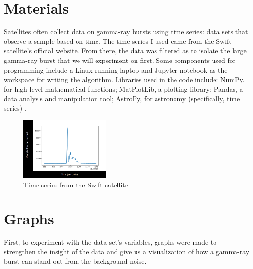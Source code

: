 \documentclass[final,5p,times,twocolumn,authoryear]{elsarticle}
\begin{document}
\section{Materials}
Satellites often collect data on gamma-ray bursts using time series: data sets that observe a sample based on time. The time series I used came from the Swift satellite's official website. From there, the data was filtered as to isolate the large gamma-ray burst that we will experiment on first. Some components used for programming include a Linux-running laptop and Jupyter notebook as the workspace for writing the algorithm. Libraries used in the code include: NumPy, for high-level mathematical functions; MatPlotLib, a plotting library; Pandas, a data analysis and manipulation tool; AstroPy, for astronomy (specifically, time series) \citep{astropy:2013} \citep{astropy:2018} \citep{astropy:2022}.
\begin{figure}[H]
	\centering 
	\includegraphics[width=0.4\textwidth]{images/TimeSeries.png}	
	\caption{Time series from the Swift satellite} 
	\label{fig_mom0}%
\end{figure}

\section{Graphs}
First, to experiment with the data set's variables, graphs were made to strengthen the insight of the data and give us a visualization of how a gamma-ray burst can stand out from the background noise.
\end{document}
